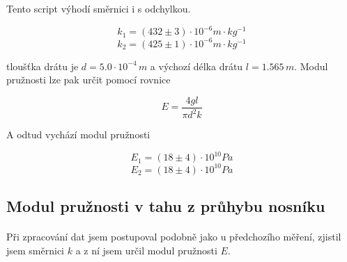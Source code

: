 \documentclass[a4paper,11pt]{article}
\begin{document}
        Tento script výhodí směrnici i s odchylkou.

        $$k_{1} = \left(432 \pm 3\right) \cdot 10^{-6} m \cdot kg^{-1}$$
        $$k_{2} = \left(425 \pm 1\right) \cdot 10^{-6} m \cdot kg^{-1}$$

        tloušťka drátu je $d = 5.0 \cdot 10^{-4} \, m$ a výchozí délka drátu
        $l = 1.565 \, m$. Modul pružnosti lze pak určit pomocí rovnice

        \begin{equation}
            E = \frac{4 g l}{\pi d^{2} k}
        \end{equation}

        A odtud vychází modul pružnosti

        $$ E_{1} = \left(18 \pm 4\right) \cdot 10^{10} Pa$$
        $$ E_{2} = \left(18 \pm 4\right) \cdot 10^{10} Pa$$

    \subsection{Modul pružnosti v tahu z průhybu nosníku}

        \paragraph{} Při zpracování dat jsem postupoval podobně jako u předchozího
        měření, zjistil jsem směrnici $k$ a z ní jsem určil modul pružnosti $E$. 
\end{document}
